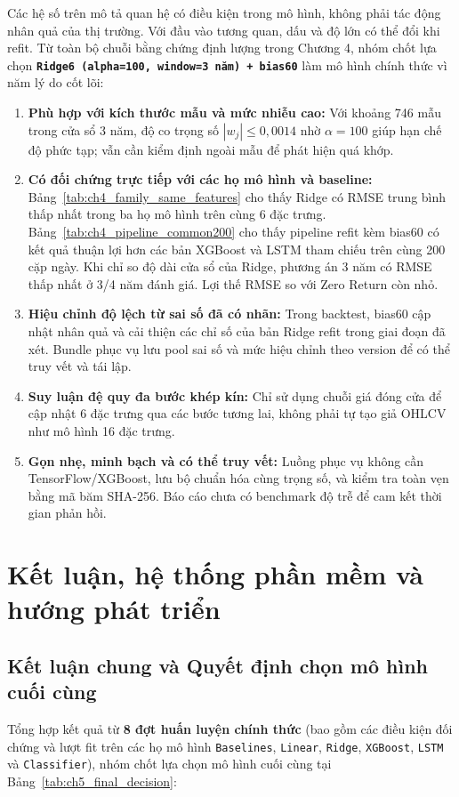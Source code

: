 \documentclass[12pt,a4paper]{report}
\begin{document}
Các hệ số trên mô tả quan hệ có điều kiện trong mô hình, không phải tác động nhân quả của thị trường. Với đầu vào tương quan, dấu và độ lớn có thể đổi khi refit. Từ toàn bộ chuỗi bằng chứng định lượng trong Chương 4, nhóm chốt lựa chọn \textbf{\texttt{Ridge6 (alpha=100, window=3 năm) + bias60}} làm mô hình chính thức vì năm lý do cốt lõi:
\begin{enumerate}
    \item \textbf{Phù hợp với kích thước mẫu và mức nhiễu cao:} Với khoảng 746 mẫu trong cửa sổ 3 năm, độ co trọng số $|w_j| \le 0,0014$ nhờ $\alpha = 100$ giúp hạn chế độ phức tạp; vẫn cần kiểm định ngoài mẫu để phát hiện quá khớp.
    \item \textbf{Có đối chứng trực tiếp với các họ mô hình và baseline:} Bảng~\ref{tab:ch4_family_same_features} cho thấy Ridge có RMSE trung bình thấp nhất trong ba họ mô hình trên cùng 6 đặc trưng. Bảng~\ref{tab:ch4_pipeline_common200} cho thấy pipeline refit kèm bias60 có kết quả thuận lợi hơn các bản XGBoost và LSTM tham chiếu trên cùng 200 cặp ngày. Khi chỉ so độ dài cửa sổ của Ridge, phương án 3 năm có RMSE thấp nhất ở 3/4 năm đánh giá. Lợi thế RMSE so với Zero Return còn nhỏ.
    \item \textbf{Hiệu chỉnh độ lệch từ sai số đã có nhãn:} Trong backtest, bias60 cập nhật nhân quả và cải thiện các chỉ số của bản Ridge refit trong giai đoạn đã xét. Bundle phục vụ lưu pool sai số và mức hiệu chỉnh theo version để có thể truy vết và tái lập.
    \item \textbf{Suy luận đệ quy đa bước khép kín:} Chỉ sử dụng chuỗi giá đóng cửa để cập nhật 6 đặc trưng qua các bước tương lai, không phải tự tạo giả OHLCV như mô hình 16 đặc trưng.
    \item \textbf{Gọn nhẹ, minh bạch và có thể truy vết:} Luồng phục vụ không cần TensorFlow/XGBoost, lưu bộ chuẩn hóa cùng trọng số, và kiểm tra toàn vẹn bằng mã băm SHA-256. Báo cáo chưa có benchmark độ trễ để cam kết thời gian phản hồi.
\end{enumerate}

\clearpage
\chapter{Kết luận, hệ thống phần mềm và hướng phát triển}

\section{Kết luận chung và Quyết định chọn mô hình cuối cùng}
Tổng hợp kết quả từ \textbf{8 đợt huấn luyện chính thức} (bao gồm các điều kiện đối chứng và lượt fit trên các họ mô hình \texttt{Baselines}, \texttt{Linear}, \texttt{Ridge}, \texttt{XGBoost}, \texttt{LSTM} và \texttt{Classifier}), nhóm chốt lựa chọn mô hình cuối cùng tại Bảng~\ref{tab:ch5_final_decision}:
\end{document}
